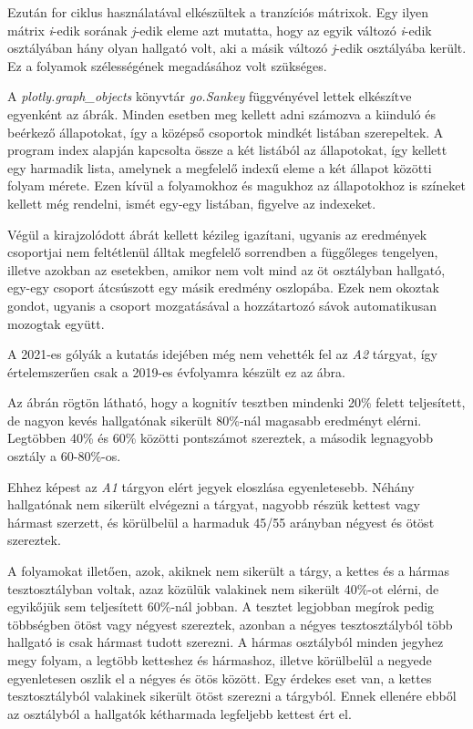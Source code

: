 \documentclass[12pt]{article}
\begin{document}
Ezután for ciklus használatával elkészültek a tranzíciós mátrixok. Egy ilyen mátrix \textit{i}-edik sorának \textit{j}-edik eleme azt mutatta, hogy az egyik változó \textit{i}-edik osztályában hány olyan hallgató volt, aki a másik változó \textit{j}-edik osztályába került. Ez a folyamok szélességének megadásához volt szükséges.

A \textit{plotly.graph\_objects} könyvtár \textit{go.Sankey} függvényével lettek elkészítve egyenként az ábrák. Minden esetben meg kellett adni számozva a kiinduló és beérkező állapotokat, így a középső csoportok mindkét listában szerepeltek. A program index alapján kapcsolta össze a két listából az állapotokat, így kellett egy harmadik lista, amelynek a megfelelő indexű eleme a két állapot közötti folyam mérete. Ezen kívül a folyamokhoz és magukhoz az állapotokhoz is színeket kellett még rendelni, ismét egy-egy listában, figyelve az indexeket. 

Végül a kirajzolódott ábrát kellett kézileg igazítani, ugyanis az eredmények csoportjai nem feltétlenül álltak megfelelő sorrendben a függőleges tengelyen, illetve azokban az esetekben, amikor nem volt mind az öt osztályban hallgató, egy-egy csoport átcsúszott egy másik eredmény oszlopába. Ezek nem okoztak gondot, ugyanis a csoport mozgatásával a hozzátartozó sávok automatikusan mozogtak együtt.



A 2021-es gólyák a kutatás idejében még nem vehették fel az \textit{A2} tárgyat, így értelemszerűen csak a 2019-es évfolyamra készült ez az ábra.

Az ábrán rögtön látható, hogy a kognitív tesztben mindenki 20\% felett teljesített, de nagyon kevés hallgatónak sikerült 80\%-nál magasabb eredményt elérni. Legtöbben 40\% és 60\% közötti pontszámot szereztek, a második legnagyobb osztály a 60-80\%-os.

Ehhez képest az \textit{A1} tárgyon elért jegyek eloszlása egyenletesebb. Néhány hallgatónak nem sikerült elvégezni a tárgyat, nagyobb részük kettest vagy hármast szerzett, és körülbelül a harmaduk 45/55 arányban négyest és ötöst szereztek.

A folyamokat illetően, azok, akiknek nem sikerült a tárgy, a kettes és a hármas tesztosztályban voltak, azaz közülük valakinek nem sikerült 40\%-ot elérni, de egyikőjük sem teljesített 60\%-nál jobban. A tesztet legjobban megírok pedig többségben ötöst vagy négyest szereztek, azonban a négyes tesztosztályból több hallgató is csak hármast tudott szerezni. A hármas osztályból minden jegyhez megy folyam, a legtöbb ketteshez és hármashoz, illetve körülbelül a negyede egyenletesen oszlik el a négyes és ötös között. Egy érdekes eset van, a kettes tesztosztályból valakinek sikerült ötöst szerezni a tárgyból. Ennek ellenére ebből az osztályból a hallgatók kétharmada legfeljebb kettest ért el.
\end{document}
